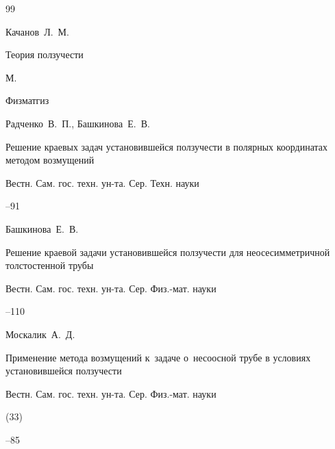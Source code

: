\begin{thebibliography}{99}




\by Качанов~Л.~М.

\book Теория ползучести

\publaddr М.

\publ Физматгиз






\by Радченко~В.~П., Башкинова~Е.~В.

\paper Решение краевых задач установившейся ползучести в полярных координатах методом возмущений

\jour Вестн. Сам. гос. техн. ун-та. Сер. Техн. науки



--91




\by Башкинова~Е.~В.

\paper Решение краевой задачи установившейся ползучести для неосесимметричной толстостенной трубы

\jour  Вестн. Сам. гос. техн. ун-та. Сер. Физ.-мат. науки



--110







\by Москалик~А.~Д.

\paper Применение метода возмущений к~задаче о~несоосной трубе в условиях установившейся ползучести

\jour Вестн. Сам. гос. техн. ун-та. Сер. Физ.-мат. науки


(33)

--85



\end{thebibliography}
